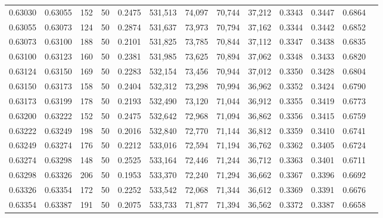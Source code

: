 \begin{tabular}{rrrrrrrrrrrrr}
0.63030 & 0.63055 &   152 &  50 &                                     0.2475 & 531,513 &  74,097 &  70,744 &  37,212 & 0.3343 & 0.3447 & 0.6864 \\
0.63055 & 0.63073 &   124 &  50 &                                     0.2874 & 531,637 &  73,973 &  70,794 &  37,162 & 0.3344 & 0.3442 & 0.6852 \\
0.63073 & 0.63100 &   188 &  50 &                                     0.2101 & 531,825 &  73,785 &  70,844 &  37,112 & 0.3347 & 0.3438 & 0.6835 \\
0.63100 & 0.63123 &   160 &  50 &                                     0.2381 & 531,985 &  73,625 &  70,894 &  37,062 & 0.3348 & 0.3433 & 0.6820 \\
0.63124 & 0.63150 &   169 &  50 &                                     0.2283 & 532,154 &  73,456 &  70,944 &  37,012 & 0.3350 & 0.3428 & 0.6804 \\
0.63150 & 0.63173 &   158 &  50 &                                     0.2404 & 532,312 &  73,298 &  70,994 &  36,962 & 0.3352 & 0.3424 & 0.6790 \\
0.63173 & 0.63199 &   178 &  50 &                                     0.2193 & 532,490 &  73,120 &  71,044 &  36,912 & 0.3355 & 0.3419 & 0.6773 \\
0.63200 & 0.63222 &   152 &  50 &                                     0.2475 & 532,642 &  72,968 &  71,094 &  36,862 & 0.3356 & 0.3415 & 0.6759 \\
0.63222 & 0.63249 &   198 &  50 &                                     0.2016 & 532,840 &  72,770 &  71,144 &  36,812 & 0.3359 & 0.3410 & 0.6741 \\
0.63249 & 0.63274 &   176 &  50 &                                     0.2212 & 533,016 &  72,594 &  71,194 &  36,762 & 0.3362 & 0.3405 & 0.6724 \\
0.63274 & 0.63298 &   148 &  50 &                                     0.2525 & 533,164 &  72,446 &  71,244 &  36,712 & 0.3363 & 0.3401 & 0.6711 \\
0.63298 & 0.63326 &   206 &  50 &                                     0.1953 & 533,370 &  72,240 &  71,294 &  36,662 & 0.3367 & 0.3396 & 0.6692 \\
0.63326 & 0.63354 &   172 &  50 &                                     0.2252 & 533,542 &  72,068 &  71,344 &  36,612 & 0.3369 & 0.3391 & 0.6676 \\
0.63354 & 0.63387 &   191 &  50 &                                     0.2075 & 533,733 &  71,877 &  71,394 &  36,562 & 0.3372 & 0.3387 & 0.6658 \\

\end{tabular}
